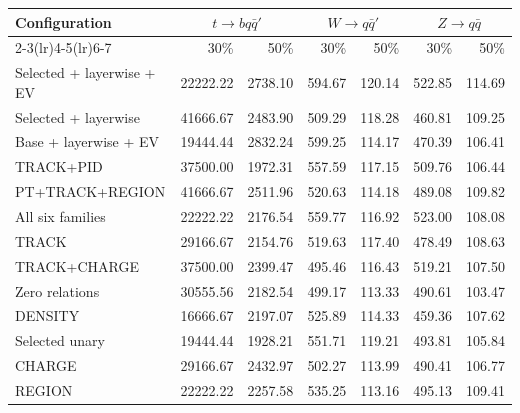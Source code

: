 \begin{table}[htbp]
\centering
\footnotesize
\setlength{\tabcolsep}{2.5pt}
\begin{tabularx}{\linewidth}{@{}Xrrrrrr@{}}
\toprule
Configuration & \multicolumn{2}{c}{$t\to bq\bar q'$} & \multicolumn{2}{c}{$W\to q\bar q'$} & \multicolumn{2}{c}{$Z\to q\bar q$} \\
\cmidrule(lr){2-3}\cmidrule(lr){4-5}\cmidrule(lr){6-7}
 & 30\% & 50\% & 30\% & 50\% & 30\% & 50\% \\
\midrule
Selected + layerwise + EV & 22222.22 & 2738.10 & 594.67 & 120.14 & 522.85 & 114.69 \\ %
Selected + layerwise & 41666.67 & 2483.90 & 509.29 & 118.28 & 460.81 & 109.25 \\ %
Base + layerwise + EV & 19444.44 & 2832.24 & 599.25 & 114.17 & 470.39 & 106.41 \\ %
TRACK+PID & 37500.00 & 1972.31 & 557.59 & 117.15 & 509.76 & 106.44 \\ %
PT+TRACK+REGION & 41666.67 & 2511.96 & 520.63 & 114.18 & 489.08 & 109.82 \\ %
All six families & 22222.22 & 2176.54 & 559.77 & 116.92 & 523.00 & 108.08 \\ %
TRACK & 29166.67 & 2154.76 & 519.63 & 117.40 & 478.49 & 108.63 \\ %
TRACK+CHARGE & 37500.00 & 2399.47 & 495.46 & 116.43 & 519.21 & 107.50 \\ %
Zero relations & 30555.56 & 2182.54 & 499.17 & 113.33 & 490.61 & 103.47 \\ %
DENSITY & 16666.67 & 2197.07 & 525.89 & 114.33 & 459.36 & 107.62 \\ %
Selected unary & 19444.44 & 1928.21 & 551.71 & 119.21 & 493.81 & 105.84 \\ %
CHARGE & 29166.67 & 2432.97 & 502.27 & 113.99 & 490.41 & 106.77 \\ %
REGION & 22222.22 & 2257.58 & 535.25 & 113.16 & 495.13 & 109.41 \\ %

\end{tabularx}
\end{table}
